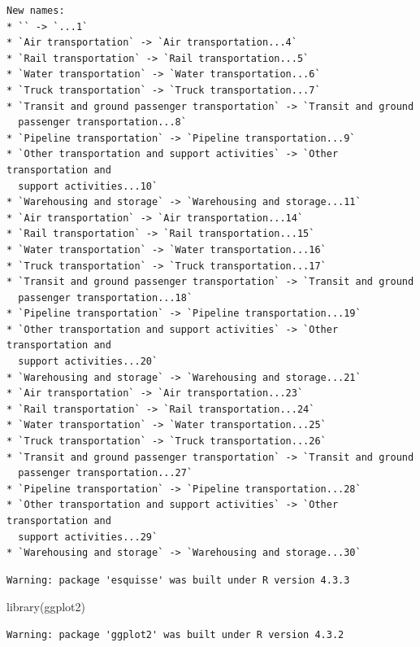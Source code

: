 \documentclass[
  letterpaper,
  DIV=11,
  numbers=noendperiod]{scrreprt}
\newenvironment{Shaded}{\begin{snugshade}}{\end{snugshade}}
\newcommand{\FunctionTok}[1]{\textcolor[rgb]{0.28,0.35,0.67}{#1}}
\newcommand{\NormalTok}[1]{\textcolor[rgb]{0.00,0.23,0.31}{#1}}
\begin{document}
\begin{verbatim}
New names:
* `` -> `...1`
* `Air transportation` -> `Air transportation...4`
* `Rail transportation` -> `Rail transportation...5`
* `Water transportation` -> `Water transportation...6`
* `Truck transportation` -> `Truck transportation...7`
* `Transit and ground passenger transportation` -> `Transit and ground
  passenger transportation...8`
* `Pipeline transportation` -> `Pipeline transportation...9`
* `Other transportation and support activities` -> `Other transportation and
  support activities...10`
* `Warehousing and storage` -> `Warehousing and storage...11`
* `Air transportation` -> `Air transportation...14`
* `Rail transportation` -> `Rail transportation...15`
* `Water transportation` -> `Water transportation...16`
* `Truck transportation` -> `Truck transportation...17`
* `Transit and ground passenger transportation` -> `Transit and ground
  passenger transportation...18`
* `Pipeline transportation` -> `Pipeline transportation...19`
* `Other transportation and support activities` -> `Other transportation and
  support activities...20`
* `Warehousing and storage` -> `Warehousing and storage...21`
* `Air transportation` -> `Air transportation...23`
* `Rail transportation` -> `Rail transportation...24`
* `Water transportation` -> `Water transportation...25`
* `Truck transportation` -> `Truck transportation...26`
* `Transit and ground passenger transportation` -> `Transit and ground
  passenger transportation...27`
* `Pipeline transportation` -> `Pipeline transportation...28`
* `Other transportation and support activities` -> `Other transportation and
  support activities...29`
* `Warehousing and storage` -> `Warehousing and storage...30`
\end{verbatim}

\begin{verbatim}
Warning: package 'esquisse' was built under R version 4.3.3
\end{verbatim}

\begin{Shaded}
\begin{Highlighting}[]
\FunctionTok{library}\NormalTok{(ggplot2)}
\end{Highlighting}
\end{Shaded}

\begin{verbatim}
Warning: package 'ggplot2' was built under R version 4.3.2
\end{verbatim}
\end{document}
